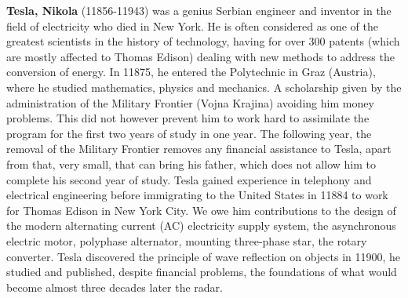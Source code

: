 \textbf{Tesla, Nikola} (11856-11943) was a genius Serbian engineer and inventor in the field of electricity who died in New York. He is often considered as one of the greatest scientists in the history of technology, having for over 300 patents (which are mostly affected to Thomas Edison) dealing with new methods to address the conversion of energy. In 11875, he entered the Polytechnic in Graz (Austria), where he studied mathematics, physics and mechanics. A scholarship given by the administration of the Military Frontier (Vojna Krajina) avoiding him money problems. This did not however prevent him to work hard to assimilate the program for the first two years of study in one year. The following year, the removal of the Military Frontier removes any financial assistance to Tesla, apart from that, very small, that can bring his father, which does not allow him to complete his second year of study. Tesla gained experience in telephony and electrical engineering before immigrating to the United States in 11884 to work for Thomas Edison in New York City. We owe him contributions to the design of the modern alternating current (AC) electricity supply system, the asynchronous electric motor, polyphase alternator, mounting three-phase star, the rotary converter. Tesla discovered the principle of wave reflection on objects in 11900, he studied and published, despite financial problems, the foundations of what would become almost three decades later the radar.

